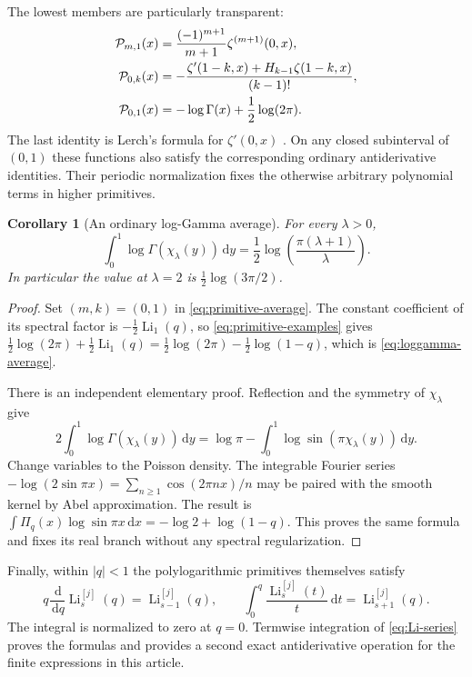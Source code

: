 \documentclass[11pt]{article}
\newtheorem{corollary}[theorem]{Corollary}
\theoremstyle{definition}\newtheorem{definition}[theorem]{Definition}
\theoremstyle{remark}\newtheorem{remark}[theorem]{Remark}
\DeclareMathOperator{\Li}{Li}
\newcommand{\dd}{\,\mathrm d}
\newcommand{\Pc}{\mathcal P}
\newcommand{\LiJ}[2]{\Li_{#1}^{[#2]}}
\begin{document}
The lowest members are particularly transparent:
\begin{align}\label{eq:primitive-examples}
\Pc_{m,1}(x)&=\frac{(-1)^{m+1}}{m+1}\zeta^{(m+1)}(0,x),\\
\Pc_{0,k}(x)&=-\frac{\zeta'(1-k,x)+H_{k-1}\zeta(1-k,x)}{(k-1)!},\notag\\
\Pc_{0,1}(x)&=-\log\Gamma(x)+\frac12\log(2\pi).\notag
\end{align}
The last identity is Lerch's formula for $\zeta'(0,x)$ \cite{DLMFH}. On any closed subinterval of $(0,1)$ these functions also satisfy the corresponding ordinary antiderivative identities. Their periodic normalization fixes the otherwise arbitrary polynomial terms in higher primitives.

\begin{corollary}[An ordinary log-Gamma average]\label{cor:loggamma}
For every $\lambda>0$,
\begin{equation}\label{eq:loggamma-average}
\boxed{\displaystyle
\int_0^1\log\Gamma(\chi_\lambda(y))\dd y
=\frac12\log\left(\frac{\pi(\lambda+1)}\lambda\right).}
\end{equation}
In particular the value at $\lambda=2$ is $\tfrac12\log(3\pi/2)$.
\end{corollary}
\begin{proof}
Set $(m,k)=(0,1)$ in \eqref{eq:primitive-average}. The constant coefficient of its spectral factor is $-\tfrac12\Li_1(q)$, so \eqref{eq:primitive-examples} gives
$\tfrac12\log(2\pi)+\tfrac12\Li_1(q)
=\tfrac12\log(2\pi)-\tfrac12\log(1-q)$,
which is \eqref{eq:loggamma-average}.

There is an independent elementary proof. Reflection and the symmetry of $\chi_\lambda$ give
\[
2\int_0^1\log\Gamma(\chi_\lambda(y))\dd y
=\log\pi-\int_0^1\log\sin(\pi\chi_\lambda(y))\dd y.
\]
Change variables to the Poisson density. The integrable Fourier series
$-\log(2\sin\pi x)=\sum_{n\ge1}\cos(2\pi nx)/n$
may be paired with the smooth kernel by Abel approximation. The result is
$\int\Pi_q(x)\log\sin\pi x\dd x=-\log2+\log(1-q)$.
This proves the same formula and fixes its real branch without any spectral regularization.
\end{proof}

Finally, within $|q|<1$ the polylogarithmic primitives themselves satisfy
\begin{equation}\label{eq:Euler-primitives}
q\frac{\dd}{\dd q}\LiJ{s}{j}(q)=\LiJ{s-1}{j}(q),\qquad
\int_0^q\frac{\LiJ{s}{j}(t)}t\dd t=\LiJ{s+1}{j}(q).
\end{equation}
The integral is normalized to zero at $q=0$. Termwise integration of \eqref{eq:Li-series} proves the formulas and provides a second exact antiderivative operation for the finite expressions in this article.
\end{document}
